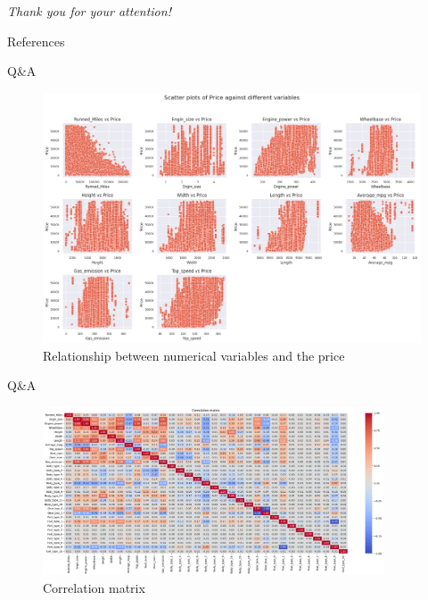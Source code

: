 \documentclass{beamer}
\begin{document}
\begin{frame}
  \begin{center}
    \Huge \textit{Thank you for your attention!}
  \end{center}
\end{frame}

\begin{frame}{References}
  \begin{center}
    \printbibliography
  \end{center}
\end{frame}



    \begin{frame}{Q\&A} 
        
        \begin{figure}
         
        \includegraphics[width=0.8\linewidth]{numerique variables.png}
        \caption{Relationship between numerical variables and the price}
        \end{figure}
    \end{frame}

\begin{frame}{Q\&A}
\begin{figure}[ht]
    \centering
    \includegraphics[width=0.90\textwidth]{Correlation matrix.png}
    \caption{Correlation matrix}
    \label{Correlation matrix}
\end{figure}
\end{frame}
\end{document}

